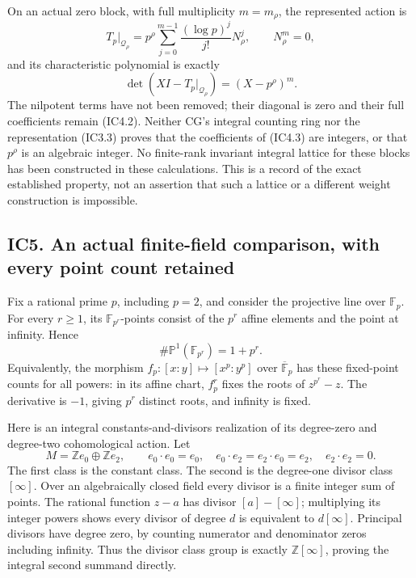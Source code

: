 \documentclass[
]{article}
\begin{document}
On an actual zero block, with full multiplicity \(m=m_\rho\), the
represented action is \[
T_p|_{\mathcal Q_\rho}
=p^\rho\sum_{j=0}^{m-1}\frac{(\log p)^j}{j!}N_\rho^j,
\qquad N_\rho^m=0,
\tag{IC4.2}
\] and its characteristic polynomial is exactly \[
\det(XI-T_p|_{\mathcal Q_\rho})=(X-p^\rho)^m.
\tag{IC4.3}
\] The nilpotent terms have not been removed; their diagonal is zero and
their full coefficients remain (IC4.2). Neither CG's integral counting
ring nor the representation (IC3.3) proves that the coefficients of
(IC4.3) are integers, or that \(p^\rho\) is an algebraic integer. No
finite-rank invariant integral lattice for these blocks has been
constructed in these calculations. This is a record of the exact
established property, not an assertion that such a lattice or a
different weight construction is impossible.

\subsection{IC5. An actual finite-field comparison, with every point
count
retained}\label{ic5.-an-actual-finite-field-comparison-with-every-point-count-retained}

Fix a rational prime \(p\), including \(p=2\), and consider the
projective line over \(\mathbb F_p\). For every \(r\ge1\), its
\(\mathbb F_{p^r}\)-points consist of the \(p^r\) affine elements and
the point at infinity. Hence \[
\#\mathbb P^1(\mathbb F_{p^r})=1+p^r.
\tag{IC5.1}
\] Equivalently, the morphism \(f_p:[x:y]\mapsto[x^p:y^p]\) over
\(\overline{\mathbb F}_p\) has these fixed-point counts for all powers:
in its affine chart, \(f_p^r\) fixes the roots of \(z^{p^r}-z\). The
derivative is \(-1\), giving \(p^r\) distinct roots, and infinity is
fixed.

Here is an integral constants-and-divisors realization of its
degree-zero and degree-two cohomological action. Let \[
M=\mathbb Ze_0\oplus\mathbb Ze_2,
\qquad e_0\cdot e_0=e_0,
\quad e_0\cdot e_2=e_2\cdot e_0=e_2,
\quad e_2\cdot e_2=0.
\tag{IC5.2}
\] The first class is the constant class. The second is the degree-one
divisor class \([\infty]\). Over an algebraically closed field every
divisor is a finite integer sum of points. The rational function \(z-a\)
has divisor \([a]-[\infty]\); multiplying its integer powers shows every
divisor of degree \(d\) is equivalent to \(d[\infty]\). Principal
divisors have degree zero, by counting numerator and denominator zeros
including infinity. Thus the divisor class group is exactly
\(\mathbb Z[\infty]\), proving the integral second summand directly.
\end{document}
